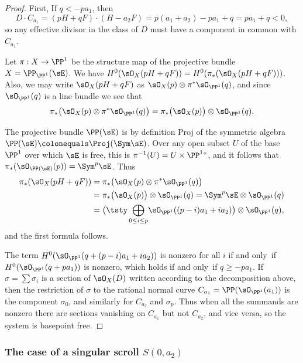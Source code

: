 \begin{proof} First, If $q<-pa_{1}$, then
$$
D\cdot C_{a_{1}} = (pH+qF) \cdot (H-a_{2}F) = p(a_{1}+a_{2}) -pa_{1}+q =
pa_{1}+q < 0,
$$
so any effective divisor in the class of $D$ must have a component in
common with $C_{a_{1}}$.

Let $\pi:X\to \PP^{1}$ be the structure map of the projective bundle $X
= \PP_{\PP^{1}}(\sE)$.
We have $H^{0}(\sO_{X}(pH+qF)) = H^{0}(\pi_{*}(\sO_{X}(pH+qF)))$. Also,
we may write $\sO_{X}(pH+qF)$ as $\sO_{X}(p) \otimes
\pi^{*}\sO_{\PP^{1}}(q)$, and since
$\sO_{\PP^{1}}(q)$ is a line bundle we see that
$$
\pi_{*}\bigl(\sO_{X}(p) \otimes \pi^{*}\sO_{\PP^{1}}(q)\bigr)
= \pi_{*}\bigl(\sO_{X}(p)\bigr)\otimes \sO_{\PP^{1}}(q).
$$

The projective bundle $\PP(\sE)$ is
by definition Proj of the symmetric algebra $\PP(\sE)\colonequals
\Proj(\Sym \sE)$. Over any open
subset $U$ of the base $\PP^1$ over which $\sE$ is free, this is
$\pi^{-1}(U) = U\times \PP^1` `$,
and it follows that $\pi_*(\sO_{\PP(\sE)}(p)) = \Sym^p\sE$.
Thus
\begin{align*}
\pi_{*}(\sO_{X}(pH+qF)) &=
\pi_{*}\bigl(\sO_{X}(p) \otimes \pi^{*}\sO_{\PP^{1}}(q)\bigr) \\
&= \pi_{*}\bigl(\sO_{X}(p)\bigr)\otimes \sO_{\PP^{1}}(q)
=  \Sym^{p} \sE\otimes \sO_{\PP^{1}}(q)\\
&=  \bigl(\tsty\bigoplus\limits_{0\leq i\leq p}\! \sO_{\PP^{1}}((p-i)a_{1}+i
a_{2})\bigr) \otimes \sO_{\PP^{1}}(q),
\end{align*}
and the first formula follows.

The term
$H^{0}(\sO_{\PP^{1}}(q + (p-i)a_{1}+i a_{2}))$ is nonzero for all $i$
if and only~if
$H^{0}(\sO_{\PP^{1}}(q + pa_{1}))$ is nonzero, which holds if and only~if
$q\geq -pa_{1}$.
If $\sigma = \sum \sigma_i$ is a section of $\sO_X(D)$ written according
to the decomposition
above, then the restriction of $\sigma$ to  the rational normal curve
$C_{a_1} = \PP(\sO_{\PP^1}(a_1))$ is the component $\sigma_0$, and
similarly for $C_{a_2}$ and $\sigma_p$. Thus when  all the summands
are nonzero
there are sections  vanishing on $C_{a_{1}}$ but not $C_{a_{2}}$, and
vice versa, so the system is basepoint free.
%
\end{proof}

\subsubsection*{The case of a 
singular scroll
$S(0,a_{2})$}

